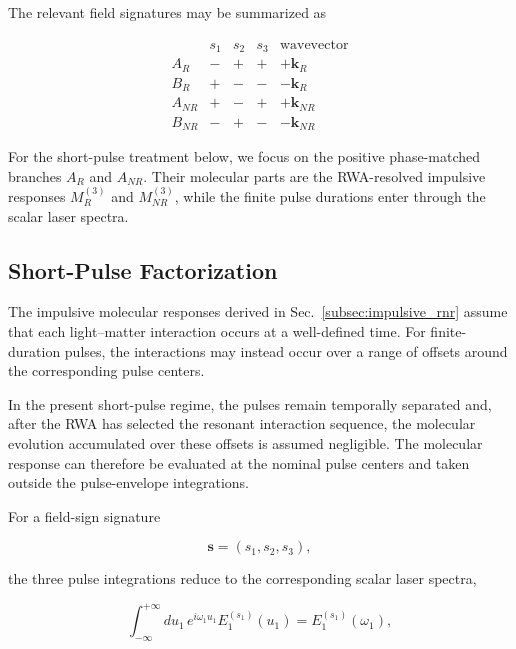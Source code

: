 \documentclass[11pt]{article}
\begin{document}
The relevant field signatures may be summarized as

\begin{equation}
\boxed{
\begin{array}{c|ccc|c}
 & s_1 & s_2 & s_3 & \text{wavevector} \\
\hline
A_R
& - & + & + & +\mathbf{k}_R \\
B_R
& + & - & - & -\mathbf{k}_R \\
A_{NR}
& + & - & + & +\mathbf{k}_{NR} \\
B_{NR}
& - & + & - & -\mathbf{k}_{NR}
\end{array}
}
\label{eq:phase_signature_table}
\end{equation}

For the short-pulse treatment below, we focus on the positive
phase-matched branches $A_R$ and $A_{NR}$. Their molecular parts are
the RWA-resolved impulsive responses $M_R^{(3)}$ and $M_{NR}^{(3)}$,
while the finite pulse durations enter through the scalar laser
spectra.


\subsection{Short-Pulse Factorization}
\label{subsec:short_pulse_factorization}

The impulsive molecular responses derived in
Sec.~\ref{subsec:impulsive_rnr} assume that each light--matter
interaction occurs at a well-defined time. For finite-duration pulses,
the interactions may instead occur over a range of offsets around the
corresponding pulse centers.

In the present short-pulse regime, the pulses remain temporally
separated and, after the RWA has selected the resonant interaction
sequence, the molecular evolution accumulated over these offsets is
assumed negligible. The molecular response can therefore be evaluated
at the nominal pulse centers and taken outside the pulse-envelope
integrations.

For a field-sign signature

\begin{equation}
\mathbf{s}
=
(s_1,s_2,s_3),
\end{equation}

the three pulse integrations reduce to the corresponding scalar laser
spectra,

\begin{equation}
\int_{-\infty}^{+\infty}
du_1\,
e^{i\omega_1u_1}
E_1^{(s_1)}(u_1)
=
E_1^{(s_1)}(\omega_1),
\end{equation}
\end{document}
